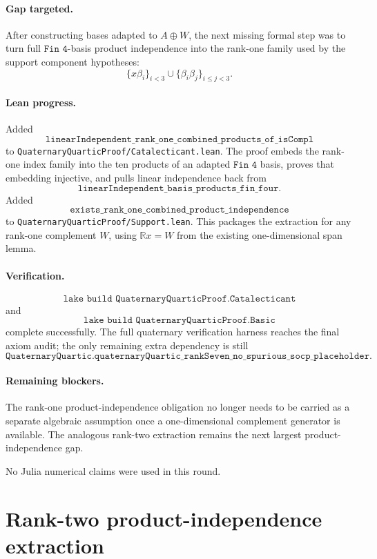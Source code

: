 \documentclass[11pt]{article}
\begin{document}
\paragraph{Gap targeted.}
After constructing bases adapted to \(A\oplus W\), the next missing formal
step was to turn full \(\texttt{Fin 4}\)-basis product independence into the
rank-one family used by the support component hypotheses:
\[
\{x\beta_i\}_{i<3}\cup\{\beta_i\beta_j\}_{i\le j<3}.
\]

\paragraph{Lean progress.}
Added
\[
\texttt{linearIndependent\_rank\_one\_combined\_products\_of\_isCompl}
\]
to \texttt{QuaternaryQuarticProof/Catalecticant.lean}.  The proof embeds the
rank-one index family into the ten products of an adapted \(\texttt{Fin 4}\)
basis, proves that embedding injective, and pulls linear independence back
from
\[
\texttt{linearIndependent\_basis\_products\_fin\_four}.
\]
Added
\[
\texttt{exists\_rank\_one\_combined\_product\_independence}
\]
to \texttt{QuaternaryQuarticProof/Support.lean}.  This packages the extraction
for any rank-one complement \(W\), using
\(\mathbb R x=W\) from the existing one-dimensional span lemma.

\paragraph{Verification.}
\[
\texttt{lake build QuaternaryQuarticProof.Catalecticant}
\]
and
\[
\texttt{lake build QuaternaryQuarticProof.Basic}
\]
complete successfully.  The full quaternary verification harness reaches the
final axiom audit; the only remaining extra dependency is still
\[
\texttt{QuaternaryQuartic.quaternaryQuartic\_rankSeven\_no\_spurious\_socp\_placeholder}.
\]

\paragraph{Remaining blockers.}
The rank-one product-independence obligation no longer needs to be carried as
a separate algebraic assumption once a one-dimensional complement generator is
available.  The analogous rank-two extraction remains the next largest
product-independence gap.

No Julia numerical claims were used in this round.

\section*{Rank-two product-independence extraction}
\end{document}
